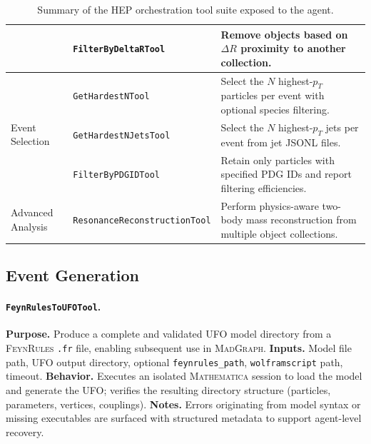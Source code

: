 \documentclass[11pt,oneside]{article}
\numberwithin{equation}{section}
\begin{document}
\begin{appendix}
\begin{table}[p!]
\begin{sideways}
\begin{tabular}{llp{10cm}}
  & \texttt{FilterByDeltaRTool} & Remove objects based on $\Delta R$ proximity to another collection. \\
\hline
\multirow{3}{*}{Event Selection}
  & \texttt{GetHardestNTool} & Select the $N$ highest-$p_T$ particles per event with optional species filtering. \\
  & \texttt{GetHardestNJetsTool} & Select the $N$ highest-$p_T$ jets per event from jet JSONL files. \\
  & \texttt{FilterByPDGIDTool} & Retain only particles with specified PDG IDs and report filtering efficiencies. \\
\hline
Advanced Analysis
  & \texttt{ResonanceReconstructionTool} & Perform physics-aware two-body mass reconstruction from multiple object collections. \\
\hline
\end{tabular}
\end{sideways}
\caption{Summary of the HEP orchestration tool suite exposed to the agent.}
\label{tab:tools}
\end{table}


\subsection{Event Generation}

\paragraph{\texttt{FeynRulesToUFOTool}.}
\textbf{Purpose.} Produce a complete and validated UFO model directory from a \textsc{FeynRules} \texttt{.fr} file, enabling subsequent use in \textsc{MadGraph}.
\textbf{Inputs.} Model file path, UFO output directory, optional \texttt{feynrules\_path}, \texttt{wolframscript} path, timeout.
\textbf{Behavior.} Executes an isolated \textsc{Mathematica} session to load the model and generate the UFO; verifies the resulting directory structure (particles, parameters, vertices, couplings).
\textbf{Notes.} Errors originating from model syntax or missing executables are surfaced with structured metadata to support agent-level recovery.


\end{appendix}
\end{document}
